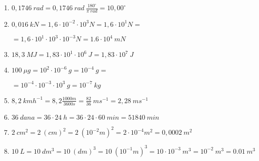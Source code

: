 

\begin{enumerate}[label=\alph*)]
  \item $0,1746\ rad= 0,1746\ rad\ \frac{180 ^\circ}{\pi\ rad} = 10,00^\circ$ 
  \item $0,016\ kN =1,6\cdot 10^{-2}\cdot 10^{3} N=1,6\cdot 10^1 N=$
  
  $=1,6\cdot 10^1 \cdot 10^{3}\cdot 10^{-3}N=1.6\cdot10^4 \ mN$
  \item $18,3\ MJ =1,83\cdot 10^1 \cdot 10^6\ J= 1,83\cdot 10^7\ J$
  \item $100\ \mu g= 10^2\cdot 10^{-6}\ g= 10^{-4}\ g=$
  
  $=10^{-4}\cdot 10^{-3}\cdot 10^3 \ g= 10^{-7}\ kg$
  \item $8,2\ kmh^{-1} =8,2 \frac{1000m}{3600s}=\frac{82}{36}\ ms^{-1}=2,28\ ms^{-1}  $
  \item $36\ dana =36\cdot24 \ h=36\cdot24\cdot60\ min = 51840 \ min$
  \item $2\ cm^2= 2\ (cm)^2=2\ (10^{-2}m)^2=2\cdot10^{-4}m^2=0,0002\ m^2 $
  \item $10\ L =10\ dm^3=10\ (dm)^3=10\ (10^{-1}m)^3=10\cdot 10^{-3}\  m^3=10^{-2}\ m^3=0.01\ m^3 $
\end{enumerate}
